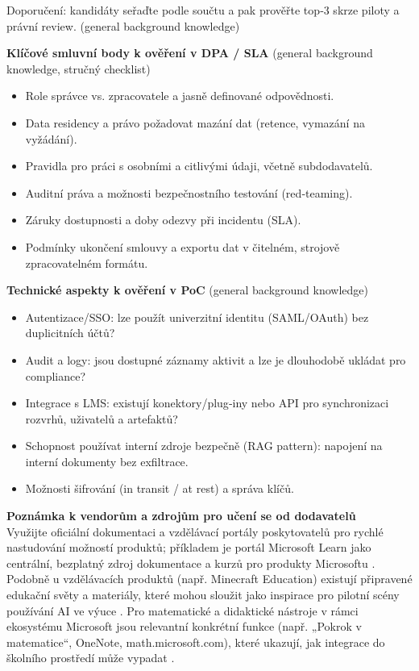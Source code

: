 \noindent Doporučení: kandidáty seřaďte podle součtu a pak prověřte top‑3 skrze piloty a právní review. (general background knowledge)

\bigskip

\textbf{Klíčové smluvní body k ověření v DPA / SLA} (general background knowledge, stručný checklist)
\begin{itemize}
  \item Role správce vs. zpracovatele a jasně definované odpovědnosti.
  \item Data residency a právo požadovat mazání dat (retence, vymazání na vyžádání).
  \item Pravidla pro práci s osobními a citlivými údaji, včetně subdodavatelů.
  \item Auditní práva a možnosti bezpečnostního testování (red‑teaming).
  \item Záruky dostupnosti a doby odezvy při incidentu (SLA).
  \item Podmínky ukončení smlouvy a exportu dat v čitelném, strojově zpracovatelném formátu.
\end{itemize}

\bigskip

\textbf{Technické aspekty k ověření v PoC} (general background knowledge)
\begin{itemize}
  \item Autentizace/SSO: lze použít univerzitní identitu (SAML/OAuth) bez duplicitních účtů?
  \item Audit a logy: jsou dostupné záznamy aktivit a lze je dlouhodobě ukládat pro compliance?
  \item Integrace s LMS: existují konektory/plug‑iny nebo API pro synchronizaci rozvrhů, uživatelů a artefaktů?
  \item Schopnost používat interní zdroje bezpečně (RAG pattern): napojení na interní dokumenty bez exfiltrace.
  \item Možnosti šifrování (in transit / at rest) a správa klíčů.
\end{itemize}

\bigskip

\textbf{Poznámka k vendorům a zdrojům pro učení se od dodavatelů} \\
Využijte oficiální dokumentaci a vzdělávací portály poskytovatelů pro rychlé nastudování možností produktů; příkladem je portál Microsoft Learn jako centrální, bezplatný zdroj dokumentace a kurzů pro produkty Microsoftu \cite{kb_ai_101_tipu_pdf_04e4a115_page_54_1}. Podobně u vzdělávacích produktů (např. Minecraft Education) existují připravené edukační světy a materiály, které mohou sloužit jako inspirace pro pilotní scény používání AI ve výuce \cite{kb_ai_101_tipu_pdf_04e4a115_page_15_2}. Pro matematické a didaktické nástroje v rámci ekosystému Microsoft jsou relevantní konkrétní funkce (např. „Pokrok v matematice“, OneNote, math.microsoft.com), které ukazují, jak integrace do školního prostředí může vypadat \cite{kb_ai_101_tipu_pdf_04e4a115_page_8_1}.

